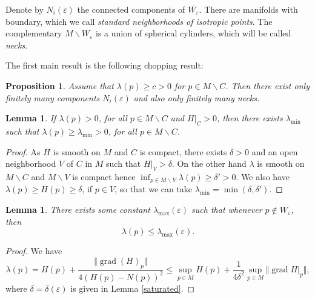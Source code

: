 \documentclass[JEP,XML,SOM,Unicode]{cedram}
\let\moins\smallsetminus
\DeclareMathOperator{\grad}{grad}
\let\parallel\Vert
\newtheorem{lemma}[theorem]{Lemma}
\newtheorem{proposition}[theorem]{Proposition}
\theoremstyle{definition}
\theoremstyle{remark}
\numberwithin{equation}{section}
\begin{document}
Denote by $N_i(\varepsilon)$ the connected components of $\overline{W_{\varepsilon}}$. There are manifolds with boundary, which we call \emph{standard neighborhoods of isotropic points}. The complementary $M\moins W_{\varepsilon}$ is a union of spherical
cylinders, which will be called \emph{necks}.

The first main result is the following chopping result:

\begin{proposition}\label{essential}
Assume that $\lambda(p) \geq c >0$ for $p\in M\moins C$.
Then there exist only finitely many components $N_i(\varepsilon)$ and also only finitely many
necks.
\end{proposition}


\begin{lemma}\label{lowerlambda}
If $\lambda(p) >0$, for all $p\in M\moins C$ and $H|_C >0$, then there exists $\lambda_{\min}$ such that
$\lambda(p) \geq \lambda_{\min}>0$, for all $p\in M\moins C$.
\end{lemma}
\begin{proof}
As $H$ is smooth on $M$ and $C$ is compact, there exists $\delta >0$ and
an open neighborhood $V$ of $C$ in $M$
such that $H|_V > \delta$. On the other hand $\lambda$ is smooth on $M\moins C$ and
$M\moins V$ is compact hence $\inf_{p\in M\moins V} \lambda(p)\geq \delta' >0$. We also have
$\lambda(p)\geq H(p)\geq \delta$, if $p\in V$, so that we can take $\lambda_{\min}=\min(\delta,\delta')$.
\end{proof}

\begin{lemma}\label{upperlambda}
There exists some constant $\lambda_{\max}(\varepsilon)$ such that whenever $p\not\in W_{\varepsilon}$, then
\[ \lambda(p)\leq \lambda_{\max}(\varepsilon).\]
\end{lemma}
\begin{proof}
We have
\[ \lambda(p)= H(p)+\frac{\parallel \grad (H)_p\parallel}{4(H(p)-N(p))^2}
\leq \sup_{p\in M} H(p)+ \frac{1}{4\delta^2} \sup _{p\in M} \parallel \grad H|_p\parallel,\]
where $\delta=\delta(\varepsilon)$ is given in Lemma \ref{saturated}.
\end{proof}
\end{document}
